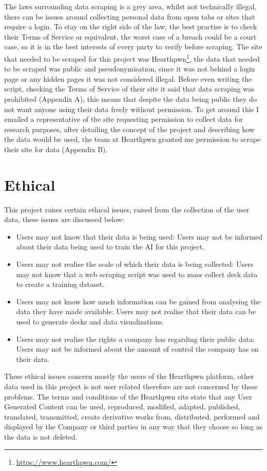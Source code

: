 \documentclass{report} %
\begin{document}
The laws surrounding data scraping is a grey area, whilst not technically illegal, there can be issues around collecting personal data from open tabs or sites that require a login. To stay on the right side of the law, the best practise is to check their Terms of Service or equivalent, the worst case of a breach could be a court case, so it is in the best interests of every party to verify before scraping. The site that needed to be scraped for this project was Hearthpwn\footnote{\url{https://www.hearthpwn.com/}}, the data that needed to be scraped was public and pseudonymisation, since it was not behind a login page or any hidden pages it was not considered illegal. Before even writing the script, checking the Terms of Service of their site it said that data scraping was prohibited (Appendix A), this means that despite the data being public they do not want anyone using their data freely without permission. To get around this I emailed a representative of the site requesting permission to collect data for research purposes, after detailing the concept of the project and describing how the data would be used, the team at Hearthpwn granted me permission to scrape their site for data (Appendix B).
    
    
    
\section{Ethical}
This project raises certain ethical issues, raised from the collection of the user data, these issues are discussed below:
\begin{itemize}
\item Users may not know that their data is being used: Users may not be informed about their data being used to train the AI for this project.
\item Users may not realise the scale of which their data is being collected: Users may not know that a web scraping script was used to mass collect deck data to create a training dataset.
\item Users may not know how much information can be gained from analysing the data they have made available: Users may not realise that their data can be used to generate decks and data visualizations.
\item Users may not realise the rights a company has regarding their public data: Users may not be informed about the amount of control the company has on their data.
\end{itemize}
These ethical issues concern mostly the users of the Hearthpwn platform, other data used in this project is not user related therefore are not concerned by these problems. The terms and conditions of the Hearthpwn site state that any User Generated Content can be used, reproduced, modified, adapted, published, translated, transmitted, create derivative works from, distributed, performed and displayed by the Company or third parties in any way that they choose so long as the data is not deleted. \\
\end{document}
